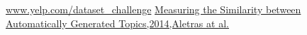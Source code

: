 \documentclass[a4paper, 10pt, conference]{ieeeconf}      %
\begin{document}











\twocolumn
\begin{thebibliography}{99}

\href{www.yelp.com/dataset_challenge}{www.yelp.com/dataset\_challenge}
\href{http://www.aclweb.org/anthology/E14-4#page=42}{Measuring the Similarity between Automatically Generated Topics,2014,Aletras at al.}
\end{thebibliography}
\end{document}
